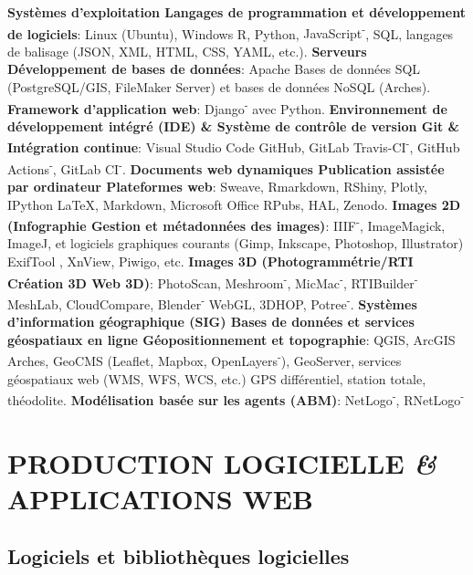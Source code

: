 \documentclass{article}
\begin{document}
\textbf{Systèmes d'exploitation {\textbar} Langages de programmation et développement de logiciels}: Linux (Ubuntu), Windows \textbf{{\textbar}} \textsf{R}, \textsf{Python}, \textsf{JavaScript\textsuperscript{-}}, SQL, langages de balisage (JSON, XML, HTML, CSS, YAML, etc.).
\smallbreak
\textbf{Serveurs {\textbar} Développement de bases de données}: Apache \textbf{{\textbar}} Bases de données SQL (PostgreSQL/GIS, FileMaker Server) et bases de données NoSQL (Arches).
\smallbreak
\textbf{Framework d'application web}: \textsf{Django}\textsuperscript{-} avec \textsf{Python}.
\smallbreak
\textbf{Environnement de développement intégré (IDE) \& Système de contrôle de version Git \& Intégration continue}: Visual Studio Code \textbf{{\textbar}} GitHub, GitLab \textbf{{\textbar}} Travis-CI\textsuperscript{-}, GitHub Actions\textsuperscript{-}, GitLab CI\textsuperscript{-}.
\smallbreak
\textbf{Documents web dynamiques {\textbar} Publication assistée par ordinateur {\textbar} Plateformes web}: \textsf{Sweave}, \textsf{Rmarkdown}, \textsf{RShiny}, \textsf{Plotly}, \textsf{IPython} \textbf{{\textbar}} \LaTeX, \textsf{Markdown}, Microsoft Office \textbf{{\textbar}} RPubs, HAL, Zenodo.
\smallbreak
\textbf{Images 2D (Infographie {\textbar} Gestion et métadonnées des images)}: IIIF\textsuperscript{-}, ImageMagick, ImageJ, et logiciels graphiques courants (Gimp, Inkscape, Photoshop, Illustrator) {\textbar} ExifTool , XnView, Piwigo, etc.
\smallbreak
\textbf{Images 3D (Photogrammétrie/RTI {\textbar} Création 3D {\textbar} Web 3D)}: PhotoScan, Meshroom\textsuperscript{-}, MicMac\textsuperscript{-}, RTIBuilder\textsuperscript{-} {\textbar} MeshLab, CloudCompare, Blender\textsuperscript{-} \textbf{{\textbar}} WebGL, 3DHOP, Potree\textsuperscript{-}.
\smallbreak
\textbf{Systèmes d'information géographique (SIG) {\textbar} Bases de données et services géospatiaux en ligne {\textbar} Géopositionnement et topographie}: QGIS, ArcGIS {\textbar} Arches, GeoCMS (\textsf{Leaflet}, \textsf{Mapbox}, \textsf{OpenLayers\textsuperscript{-}}), GeoServer, services géospatiaux web (WMS, WFS, WCS, etc.) {\textbar} GPS différentiel, station totale, théodolite.
\smallbreak
\textbf{Modélisation basée sur les agents (ABM)}: NetLogo\textsuperscript{-}, \textsf{RNetLogo\textsuperscript{-}}
\smallbreak

\section{PRODUCTION LOGICIELLE \textit{\&} APPLICATIONS WEB}

\subsection*{Logiciels et bibliothèques logicielles}
\end{document}
